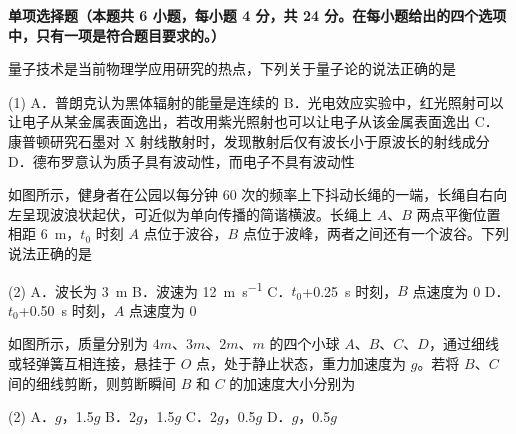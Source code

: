 

\textbf{单项选择题（本题共 6 小题，每小题 4 分，共 24 分。在每小题给出的四个选项中，只有一项是符合题目要求的。）}

\begin{question}
量子技术是当前物理学应用研究的热点，下列关于量子论的说法正确的是\gkblank

\begin{gkopts}(1)
  \task A．普朗克认为黑体辐射的能量是连续的
  \task B．光电效应实验中，红光照射可以让电子从某金属表面逸出，若改用紫光照射也可以让电子从该金属表面逸出
  \task C．康普顿研究石墨对 X 射线散射时，发现散射后仅有波长小于原波长的射线成分
  \task D．德布罗意认为质子具有波动性，而电子不具有波动性
\end{gkopts}
\end{question}

\begin{question}
如图所示，健身者在公园以每分钟 60 次的频率上下抖动长绳的一端，长绳自右向左呈现波浪状起伏，可近似为单向传播的简谐横波。长绳上 $A$、$B$ 两点平衡位置相距 \SI{6}{\metre}，$t_{0}$ 时刻 $A$ 点位于波谷，$B$ 点位于波峰，两者之间还有一个波谷。下列说法正确的是\gkblank


\begin{gkopts}(2)
  \task A．波长为 \SI{3}{\metre}
  \task B．波速为 \SI{12}{\metre\per\second}
  \task C．$t_{0}$+0.25~s 时刻，$B$ 点速度为 0
  \task D．$t_{0}$+0.50~s 时刻，$A$ 点速度为 0
\end{gkopts}
\end{question}

\begin{question}
如图所示，质量分别为 $4m$、$3m$、$2m$、$m$ 的四个小球 $A$、$B$、$C$、$D$，通过细线或轻弹簧互相连接，悬挂于 $O$ 点，处于静止状态，重力加速度为 $g$。若将 $B$、$C$ 间的细线剪断，则剪断瞬间 $B$ 和 $C$ 的加速度大小分别为\gkblank


\begin{gkopts}(2)
  \task A．$g$，1.5$g$
  \task B．2$g$，1.5$g$
  \task C．2$g$，0.5$g$
  \task D．$g$，0.5$g$
\end{gkopts}
\end{question}

